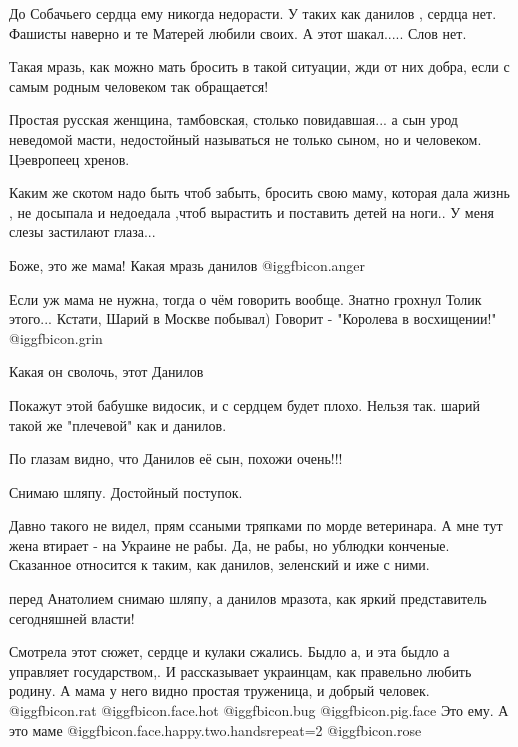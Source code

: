 \begin{itemize}
До Собачьего сердца ему никогда недорасти. У таких как данилов , сердца нет. Фашисты наверно и те Матерей любили своих. А этот шакал..... Слов нет.

Такая мразь, как можно мать бросить в такой ситуации, жди от них добра, если с самым родным человеком так обращается!

Простая русская женщина, тамбовская, столько повидавшая... а сын урод неведомой масти, недостойный называться не только сыном, но и человеком. Цэевропеец хренов.


Каким же скотом надо быть чтоб забыть, бросить свою маму, которая дала жизнь , не
досыпала и недоедала ,чтоб вырастить и поставить детей на ноги.. У меня слезы
застилают глаза...


Боже, это же мама! Какая мразь данилов @igg{fbicon.anger} 


Если уж мама не нужна, тогда о чём говорить вообще. Знатно грохнул Толик
этого... Кстати, Шарий в Москве побывал) Говорит - "Королева в восхищении!" @igg{fbicon.grin} 

Какая он сволочь, этот Данилов


Покажут этой бабушке видосик, и с сердцем будет плохо. Нельзя так.
шарий такой же "плечевой" как и данилов.

По глазам видно, что Данилов её сын, похожи очень!!!

Снимаю шляпу. Достойный поступок.


Давно такого не видел, прям ссаными тряпками по морде ветеринара. А мне тут
жена втирает - на Украине не рабы. Да, не рабы, но ублюдки конченые. Сказанное
относится к таким, как данилов, зеленский и иже с ними.


перед Анатолием снимаю шляпу, а данилов мразота, как яркий представитель
сегодняшней власти!


Смотрела этот сюжет, сердце и кулаки сжались. Быдло а, и эта быдло а управляет
государством,. И рассказывает украинцам, как правельно любить родину. А мама у
него видно простая труженица, и добрый человек.  @igg{fbicon.rat}
@igg{fbicon.face.hot}  @igg{fbicon.bug}  @igg{fbicon.pig.face} Это ему. А это
маме @igg{fbicon.face.happy.two.hands}{repeat=2}  @igg{fbicon.rose} 

\end{itemize} %
